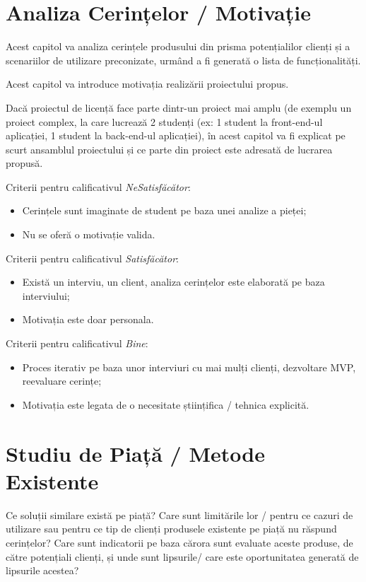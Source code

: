 \chapter{Analiza Cerințelor / Motivație}
\dezvoltare Acest capitol va analiza cerințele produsului din prisma potențialilor clienți și a scenariilor de utilizare preconizate, urmând a fi generată o lista de funcționalități. 

\cercetare Acest capitol va introduce motivația realizării proiectului propus.

Dacă proiectul de licență face parte dintr-un proiect mai amplu (de exemplu un proiect complex, la care lucrează 2 studenți (ex: 1 student la front-end-ul aplicației, 1 student la back-end-ul aplicației), în acest capitol va fi explicat pe scurt ansamblul proiectului și ce parte din proiect este adresată de lucrarea propusă. 

Criterii pentru calificativul \textit{Ne\textit{Satisfăcător}}: 
\begin{itemize}
	\item \dezvoltare Cerințele sunt imaginate de student pe baza unei analize a pieței;
	\item \cercetare Nu se oferă o motivație valida.
\end{itemize}

Criterii pentru calificativul \textit{Satisfăcător}: 
\begin{itemize}
	\item \dezvoltare Există un interviu, un client, analiza cerințelor este elaborată pe baza interviului;
	\item \cercetare Motivația este doar personala.
\end{itemize}


Criterii pentru calificativul \textit{Bine}: 
\begin{itemize}
	\item	 \dezvoltare Proces iterativ pe baza unor interviuri cu mai mulți clienți, dezvoltare MVP, reevaluare cerințe;
	\item	 \cercetare Motivația este legata de o necesitate științifica / tehnica explicită.
\end{itemize}


\chapter{Studiu de Piață / Metode Existente}
\dezvoltare Ce soluții similare există pe piață? Care sunt limitările lor / pentru ce cazuri de utilizare sau pentru ce tip de clienți produsele existente pe piață nu răspund cerințelor? Care sunt indicatorii pe baza cărora sunt evaluate aceste produse, de către potențiali clienți, și unde sunt lipsurile/ care este oportunitatea generată de lipsurile acestea?

